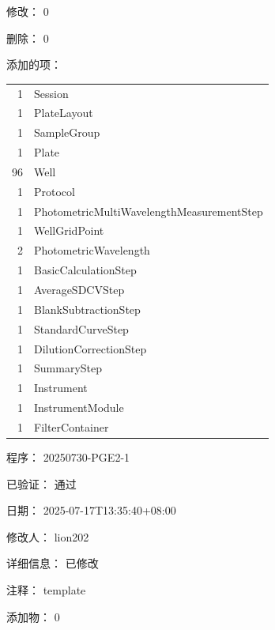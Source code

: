 \documentclass[UTF8,10pt,a4paper,fontset=fandol]{ctexart}
\newcommand{\fieldvalue}[1]{#1}
\begin{document}
\noindent
修改：%
\fieldvalue{0}

\noindent
删除：%
\fieldvalue{0}

\vspace{0.5em}

\noindent
添加的项：

\begin{tabular}{r l}
1 & Session\\
1 & PlateLayout\\
1 & SampleGroup\\
1 & Plate\\
96 & Well\\
1 & Protocol\\
1 & PhotometricMultiWavelengthMeasurementStep\\
1 & WellGridPoint\\
2 & PhotometricWavelength\\
1 & BasicCalculationStep\\
1 & AverageSDCVStep\\
1 & BlankSubtractionStep\\
1 & StandardCurveStep\\
1 & DilutionCorrectionStep\\
1 & SummaryStep\\
1 & Instrument\\
1 & InstrumentModule\\
1 & FilterContainer
\end{tabular}

\vspace{0.8em}

\noindent
程序：%
\fieldvalue{20250730-PGE2-1}

\noindent
已验证：%
\fieldvalue{通过}

\noindent
日期：%
\fieldvalue{2025-07-17T13:35:40+08:00}

\noindent
修改人：%
\fieldvalue{lion202}

\noindent
详细信息：%
\fieldvalue{已修改}

\noindent
注释：%
\fieldvalue{template}

\noindent
添加物：%
\fieldvalue{0}
\end{document}
